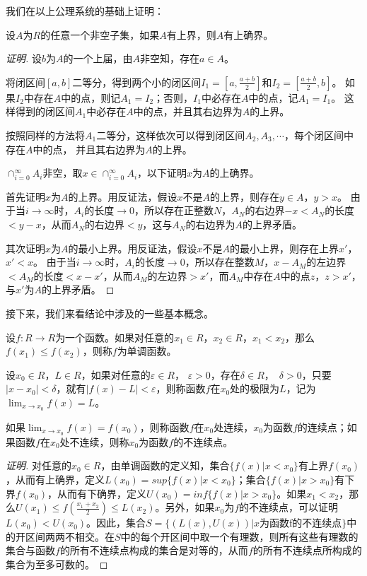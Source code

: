 \documentclass{article}
\begin{document}
\begin{CJK}{UTF8}{gbsn}
我们在以上公理系统的基础上证明：

设$A$为$R$的任意一个非空子集，如果$A$有上界，则$A$有上确界。

\begin{proof}[证明]
  设$b$为$A$的一个上届，由$A$非空知，存在$a\in A$。

  将闭区间$[a,b]$二等分，得到两个小的闭区间$I_1=[a,\frac{a+b}{2}]$和$I_2=[\frac{a+b}{2}, b]$。
  如果$I_2$中存在$A$中的点，则记$A_1=I_2$；否则，$I_1$中必存在$A$中的点，记$A_1=I_1$。
  这样得到的闭区间$A_1$中必存在$A$中的点，并且其右边界为$A$的上界。

  按照同样的方法将$A_1$二等分，这样依次可以得到闭区间$A_2,A_3,\cdots$，每个闭区间中存在$A$中的点，
  并且其右边界为$A$的上界。

  $\cap_{i=0}^{\infty}A_i$非空，取$x\in \cap_{i=0}^{\infty}A_i$，以下证明$x$为$A$的上确界。

  首先证明$x$为$A$的上界。用反证法，假设$x$不是$A$的上界，则存在$y\in A$，$y> x$。
  由于当$i\to \infty$时，$A_i$的长度$\to 0$，所以存在正整数$N$，$A_N$的右边界$-x<A_N$的长度$<y-x$，从而$A_N$的右边界$<y$，这与$A_N$的右边界为$A$的上界矛盾。

  其次证明$x$为$A$的最小上界。用反证法，假设$x$不是$A$的最小上界，则存在上界$x'$，$x'<x$。
  由于当$i\to \infty$时，$A_i$的长度$\to 0$，所以存在整数$M$，$x-A_M$的左边界$<A_M$的长度$<x-x'$，从而$A_M$的左边界$>x'$，而$A_M$中存在$A$中的点$z$，$z>x'$，与$x'$为$A$的上界矛盾。
\end{proof}

接下来，我们来看结论中涉及的一些基本概念。

设$f:R\to R$为一个函数。如果对任意的$x_1\in R$，$x_2\in R$，$x_1< x_2$，那么$f(x_1) \leq f(x_2)$，则称$f$为单调函数。

设$x_0\in R$，$L\in R$，如果对任意的$\varepsilon\in R$， $\varepsilon> 0$，存在$\delta \in R$，　$\delta > 0$，只要$|x-x_0|<\delta$，就有$|f(x) - L|<\varepsilon$，则称函数$f$在$x_0$处的极限为$L$，记为$\lim_{x\to x_0}f(x)=L$。

如果$\lim_{x\to x_0}f(x)=f(x_0)$，则称函数$f$在$x_0$处连续，$x_0$为函数$f$的连续点；如果函数$f$在$x_0$处不连续，则称$x_0$为函数$f$的不连续点。


\begin{proof}[证明]
  对任意的$x_0\in R$，由单调函数的定义知，集合$\{f(x)|x<x_0\}$有上界$f(x_0)$，从而有上确界，定义$L(x_0)=sup \{f(x)|x<x_0\}$；集合$\{f(x)|x>x_0\}$有下界$f(x_0)$，从而有下确界，定义$U(x_0)=inf \{f(x)|x>x_0\}$。如果$x_1<x_2$，那么$U(x_1)\leq f(\frac{x_1+x_2}{2}) \leq L(x_2)$。另外，如果$x_0$为$f$的不连续点，可以证明$L(x_0) <  U(x_0)$。因此，集合$S=\{(L(x),U(x))|x\text{为函数}$f$\text{的不连续点}\}$中的开区间两两不相交。在$S$中的每个开区间中取一个有理数，则所有这些有理数的集合与函数$f$的所有不连续点构成的集合是对等的，从而$f$的所有不连续点所构成的集合为至多可数的。


\end{proof}
\end{CJK}
\end{document}
